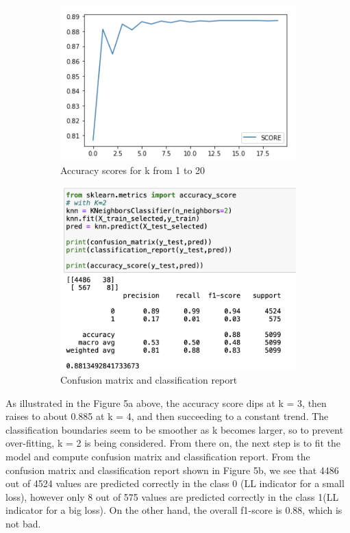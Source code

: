 \documentclass[12pt]{article} %
\theoremstyle{definition}
\begin{document}
\begin{figure}[h]
    \centering
    \begin{subfigure}{.48\textwidth}
        \centering
        \includegraphics[width=\linewidth]{KNN/kplot.png}
        \caption{Accuracy scores for k from 1 to 20}
    \end{subfigure}
    \hfill
    \begin{subfigure}{.48\linewidth}
        \centering
        \includegraphics[width=\linewidth]{KNN/validate.png}
        \caption{Confusion matrix and classification report}
    \end{subfigure}
    \caption{}
\end{figure}

As illustrated in the Figure 5a above, the accuracy score dips at k = 3, then raises to about 0.885 at k = 4, and then succeeding to a constant trend. The classification boundaries seem to be smoother as k becomes larger, so to prevent over-fitting, k = 2 is being considered. From there on, the next step is to fit the model and compute confusion matrix and classification report. From the confusion matrix and classification report shown in Figure 5b, we see that 4486 out of 4524 values are predicted correctly in the class 0 (LL indicator for a small loss), however only 8 out of 575 values are predicted correctly in the class 1(LL indicator for a big loss). On the other hand, the overall f1-score is 0.88, which is not bad.
\end{document}
